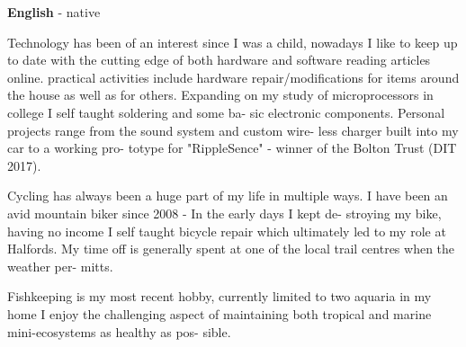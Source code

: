 \documentclass[9pt]{developercv} %
\begin{document}
\begin{minipage}[t]{0.15\textwidth}
	\vspace{-\baselineskip} %

	
	\textbf{English} - native\\
\end{minipage}
\hfill
\begin{minipage}[t]{0.4\textwidth}
	\vspace{-\baselineskip} %
	

Technology has been of an interest since I was
a child, nowadays I like to keep up to date with
the cutting edge of both hardware and software
reading articles online. practical activities include hardware repair/modifications for items
around the house as well as for others.
Expanding on my study of microprocessors in
college I self taught soldering and some ba-
sic electronic components. Personal projects
range from the sound system and custom wire-
less charger built into my car to a working pro-
totype for "RippleSence" - winner of the Bolton
Trust (DIT 2017).

	
	
\end{minipage}
\hfill
\begin{minipage}[t]{0.4\textwidth}
	\vspace{-\baselineskip} %
	
	\vspace{1.2cm}
	
	Cycling has always been a huge part of my life
in multiple ways. I have been an avid mountain
biker since 2008 - In the early days I kept de-
stroying my bike, having no income I self taught
bicycle repair which ultimately led to my role at
Halfords. My time off is generally spent at one
of the local trail centres when the weather per-
mitts.


Fishkeeping is my most recent hobby, currently
limited to two aquaria in my home I enjoy the
challenging aspect of maintaining both tropical
and marine mini-ecosystems as healthy as pos-
sible.

\end{minipage}

\end{document}
